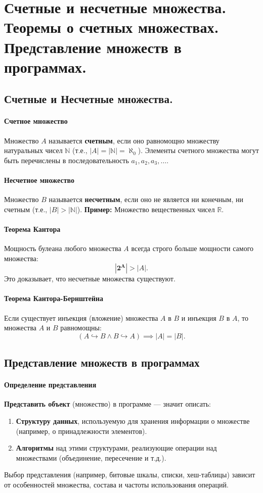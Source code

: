 \section{Счетные и несчетные множества. Теоремы о счетных множествах. Представление множеств в программах.}


\subsection*{Счетные и Несчетные множества.}
\paragraph{Счетное множество}
Множество $A$ называется \textbf{счетным}, если оно равномощно множеству натуральных чисел $\mathbb{N}$ (т.е., $|A| = |\mathbb{N}| = \aleph_0$). Элементы счетного множества могут быть перечислены в последовательность $a_1, a_2, a_3, \ldots$.

\paragraph{Несчетное множество}
Множество $B$ называется \textbf{несчетным}, если оно не является ни конечным, ни счетным (т.е., $|B| > |\mathbb{N}|$). \textbf{Пример:} Множество вещественных чисел $\mathbb{R}$.

\paragraph{Теорема Кантора}
Мощность булеана любого множества $A$ всегда строго больше мощности самого множества:
$$|\mathbf{2^A}| > |A|.$$
Это доказывает, что несчетные множества существуют.

\paragraph{Теорема Кантора-Бернштейна}
Если существует инъекция (вложение) множества $A$ в $B$ и инъекция $B$ в $A$, то множества $A$ и $B$ равномощны:
$$(A \hookrightarrow B \land B \hookrightarrow A) \implies |A| = |B|.$$

\subsection*{Представление множеств в программах}

\paragraph{Определение представления}
\textbf{Представить объект} (множество) в программе --- значит описать:
\begin{enumerate}
    \item \textbf{Структуру данных}, используемую для хранения информации о множестве (например, о принадлежности элементов).
    \item \textbf{Алгоритмы} над этими структурами, реализующие операции над множествами (объединение, пересечение и т.д.).
\end{enumerate}
Выбор представления (например, битовые шкалы, списки, хеш-таблицы) зависит от особенностей множества, состава и частоты использования операций.

